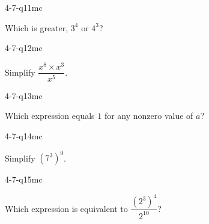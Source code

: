 \begin{practiceQuestion}{4-7-q11}{mc}
\begin{questionText}
Which is greater, $3^4$ or $4^3$?
\end{questionText}
\end{practiceQuestion}

\begin{practiceQuestion}{4-7-q12}{mc}
\begin{questionText}
Simplify $\dfrac{x^8 \times x^3}{x^5}$.
\end{questionText}
\end{practiceQuestion}

\begin{practiceQuestion}{4-7-q13}{mc}
\begin{questionText}
Which expression equals $1$ for any nonzero value of $a$?
\end{questionText}
\end{practiceQuestion}

\begin{practiceQuestion}{4-7-q14}{mc}
\begin{questionText}
Simplify $(7^3)^0$.
\end{questionText}
\end{practiceQuestion}

\begin{practiceQuestion}{4-7-q15}{mc}
\begin{questionText}
Which expression is equivalent to $\dfrac{(2^3)^4}{2^{10}}$?
\end{questionText}
\end{practiceQuestion}


